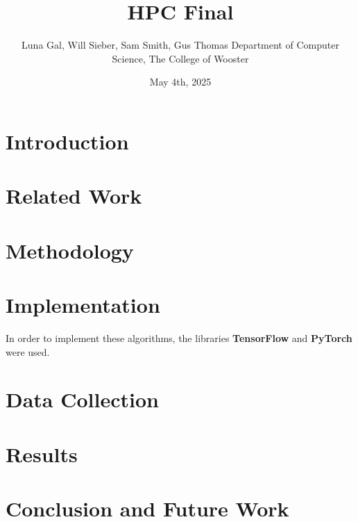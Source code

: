 \documentclass[12pt]{article}
\title{HPC Final}
\date{May 4th, 2025}
\author{\parbox{\linewidth}{\centering%
    Luna Gal, Will Sieber, Sam Smith, Gus Thomas
	\endgraf\bigskip
	Department of Computer Science, The College of Wooster
	\bigskip
}}
\begin{document}
\maketitle

\newpage
\tableofcontents
\newpage

\lstlistoflistings
\newpage

\section{Introduction}

\section{Related Work}

\section{Methodology}

\section{Implementation}

In order to implement these algorithms, the libraries \textbf{TensorFlow} and \textbf{PyTorch} were used.
\hfill\break

\lstset{style=mystyle}


\section{Data Collection}

\section{Results}

\section{Conclusion and Future Work}

\newpage
%
%
\end{document}
